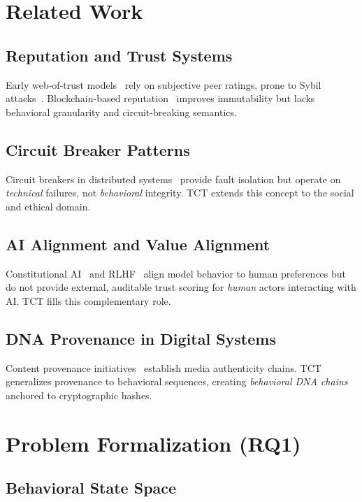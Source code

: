 \documentclass[conference]{IEEEtran}
\begin{document}
\section{Related Work}

\subsection{Reputation and Trust Systems}
Early web-of-trust models~\cite{Josang2007} rely on subjective peer
ratings, prone to Sybil attacks~\cite{Douceur2002}.
Blockchain-based reputation~\cite{Schaub2016} improves immutability
but lacks behavioral granularity and circuit-breaking semantics.

\subsection{Circuit Breaker Patterns}
Circuit breakers in distributed systems~\cite{Nygard2007} provide
fault isolation but operate on \emph{technical} failures, not
\emph{behavioral} integrity.
TCT extends this concept to the social and ethical domain.

\subsection{AI Alignment and Value Alignment}
Constitutional AI~\cite{Bai2022} and RLHF~\cite{Ouyang2022} align
model behavior to human preferences but do not provide external,
auditable trust scoring for \emph{human} actors interacting with AI.
TCT fills this complementary role.

\subsection{DNA Provenance in Digital Systems}
Content provenance initiatives~\cite{C2PA2023} establish media
authenticity chains.
TCT generalizes provenance to behavioral sequences, creating
\emph{behavioral DNA chains} anchored to cryptographic hashes.

\section{Problem Formalization (RQ1)}

\subsection{Behavioral State Space}
\end{document}
